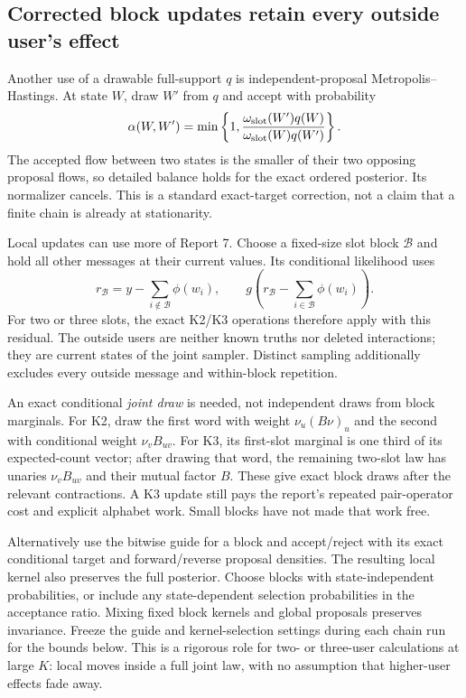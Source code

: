 \documentclass[10pt,a4paper]{article}
\begin{document}
\subsection{Corrected block updates retain every outside user's effect}
Another use of a drawable full-support $q$ is independent-proposal Metropolis--Hastings. At state $W$, draw
$W'$ from $q$ and accept with probability
\[
 \alpha(W,W')=\min\left\{1,
        \frac{\omega_{\rm slot}(W')q(W)}{\omega_{\rm slot}(W)q(W')}\right\}.
\]
The accepted flow between two states is the smaller of their two opposing proposal flows, so detailed
balance holds for the exact ordered posterior. Its normalizer cancels. This is a standard exact-target
correction, not a claim that a finite chain is already at stationarity.

Local updates can use more of Report 7. Choose a fixed-size slot block $\mathcal B$ and hold all other
messages at their current values. Its conditional likelihood uses
\[
 r_{\mathcal B}=y-\sum_{i\notin\mathcal B}\phi(w_i),\qquad
 g\!\left(r_{\mathcal B}-\sum_{i\in\mathcal B}\phi(w_i)\right).
\]
For two or three slots, the exact K2/K3 operations therefore apply with this residual. The outside users
are neither known truths nor deleted interactions; they are current states of the joint sampler.
Distinct sampling additionally excludes every outside message and within-block repetition.

An exact conditional \emph{joint draw} is needed, not independent draws from block marginals. For K2,
draw the first word with weight $\nu_u(B\nu)_u$ and the second with conditional weight $\nu_vB_{uv}$.
For K3, its first-slot marginal is one third of its expected-count vector; after drawing that word, the
remaining two-slot law has unaries $\nu_vB_{uv}$ and their mutual factor $B$.
These give exact block draws after the relevant contractions. A K3 update still pays the report's repeated
pair-operator cost and explicit alphabet work. Small blocks have not made that work free.

Alternatively use the bitwise guide for a block and accept/reject with its exact conditional target and
forward/reverse proposal densities. The resulting local kernel also preserves the full posterior.
Choose blocks with state-independent probabilities, or include any state-dependent selection probabilities
in the acceptance ratio. Mixing fixed block kernels and global proposals preserves invariance.
Freeze the guide and kernel-selection settings during each chain run for the bounds below.
This is a rigorous role for two- or three-user calculations at large $K$: local moves inside a full joint
law, with no assumption that higher-user effects fade away.
\end{document}
